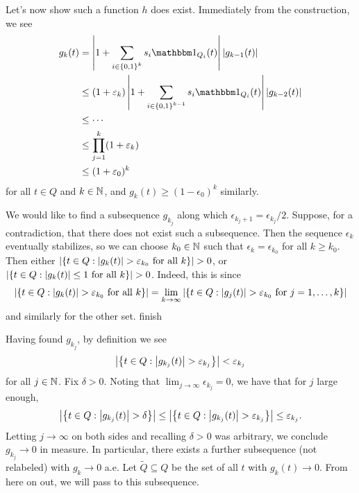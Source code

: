 Let's now show such a function $h$ does exist. Immediately from the construction, we see
\begin{equation} \begin{aligned}
    g_k(t) &= \abs{1 + \sum_{i \in \set{0,1}^k} s_i \bbone_{Q_i}(t)} \abs{g_{k-1}(t)} \\
                 &\leq (1 + \epsilon_k) \abs{1 + \sum_{i \in \set{0,1}^{k-1}} s_i \bbone_{Q_i}(t)} \abs{g_{k-2}(t)} \\
                 &\leq \cdots \\
                 &\leq \prod_{j=1}^k (1 + \epsilon_k) \\
                 &\leq (1 + \epsilon_0)^k
\end{aligned} \end{equation}
for all $t \in Q$ and $k \in \mathbb{N}$, and $g_k(t) \geq (1 - \epsilon_0)^k$ similarly.

We would like to find a subsequence $g_{k_j}$ along which $\epsilon_{k_j+1} = \epsilon_{k_j}/2$. Suppose, for a contradiction, that there does not exist such a subsequence. Then the sequence $\epsilon_k$ eventually stabilizes, so we can choose $k_0 \in \mathbb{N}$ such that $\epsilon_k = \epsilon_{k_0}$ for all $k \geq k_0$. Then either $\left\vert { \left\{ {t \in Q : \left\vert {g_k(t)} \right\vert > \varepsilon_{k_0} \text{ for all } k } \right\}} \right\vert > 0$, or $\left\vert { \left\{ {t \in Q : \left\vert {g_k(t)} \right\vert \leq 1 \text{ for all } k } \right\}} \right\vert > 0$. Indeed, this is since 
\begin{equation}
    \left\vert { \left\{ { t \in Q : \left\vert {g_k(t)} \right\vert > \varepsilon_{k_0} \text{ for all } k } \right\} } \right\vert = \lim_{k \to \infty} \left\vert { \left\{ { t \in Q : \left\vert {g_j(t)} \right\vert > \varepsilon_{k_0} \text{ for } j = 1,\dots,k } \right\} } \right\vert
\end{equation}
and similarly for the other set. {\color{red} finish}

Having found $g_{k_j}$, by definition we see
\begin{equation}
    \left\vert { \left\{ {t \in Q : \left\vert {g_{k_j}(t)} \right\vert > \varepsilon_{k_j}} \right\} } \right\vert < \varepsilon_{k_j}
\end{equation}
for all $j \in \mathbb{N}$. Fix $\delta > 0$. Noting that $\lim_{j \to \infty} \epsilon_{k_j} = 0$, we have that for $j$ large enough,
\begin{equation}
    \left\vert { \left\{ {t \in Q : \left\vert {g_{k_j}(t)} \right\vert > \delta } \right\} } \right\vert \leq \left\vert { \left\{ {t \in Q : \left\vert {g_{k_j}(t)} \right\vert > \varepsilon_{k_j}} \right\} } \right\vert \leq \varepsilon_{k_j}.
\end{equation}
Letting $j \to \infty$ on both sides and recalling $\delta > 0$ was arbitrary, we conclude $g_{k_j} \to 0$ in measure. In particular, there exists a further subsequence (not relabeled) with $g_k \to 0$ a.e. Let $\widetilde{Q} \subseteq Q$ be the set of all $t$ with $g_k(t) \to 0$. From here on out, we will pass to this subsequence.


